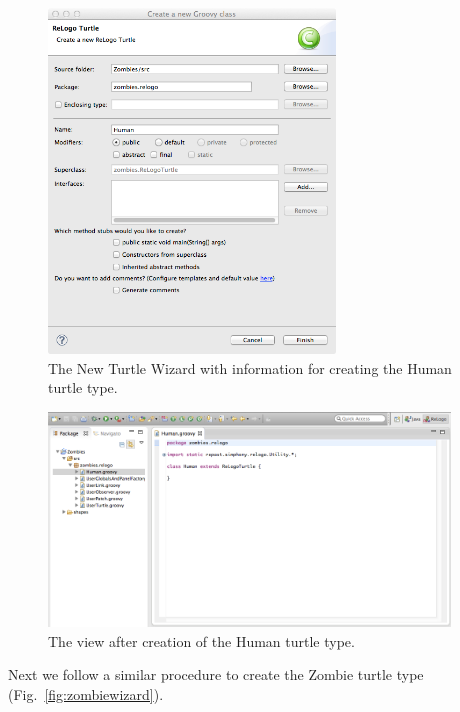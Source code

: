 \documentclass[11pt]{amsart}
\begin{document}
\begin{figure}
\begin{center}
\vspace{.2in}
\centerline {
\includegraphics[width=3in]{GettingStartedImages/Human1.png}
}
\caption{The New Turtle Wizard with information for creating the Human turtle type.}
\label{fig:humanwizard}
\end{center}
\end{figure}

\begin{figure}
\begin{center}
\vspace{.2in}
\centerline {
\includegraphics[width=4.2in]{GettingStartedImages/Human2.png}
}
\caption{The view after creation of the Human turtle type.}
\label{fig:humantype}
\end{center}
\end{figure}

Next we follow a similar procedure to create the Zombie turtle type (Fig.~\ref{fig:zombiewizard}).
\end{document}
